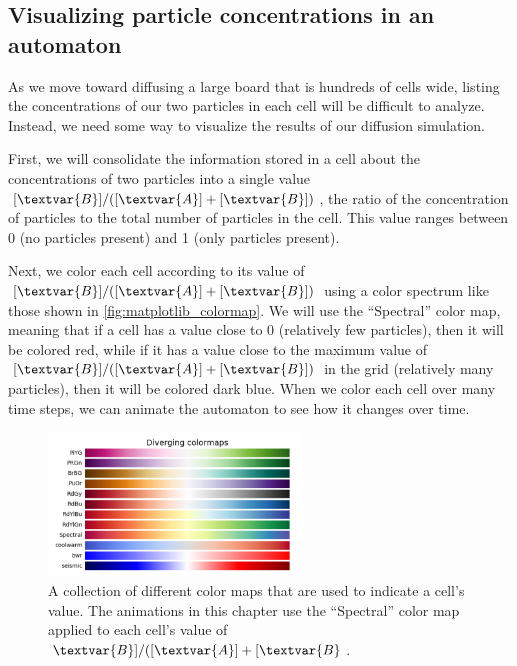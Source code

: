 \begin{qbox}[%
Update the cells in \autoref{fig:two_particle_concentration_diffusion} after another generation of diffusion, using the diffusion rates $d_A = 0.2$ and $d_B = 0.1$.
]\end{qbox}

\FloatBarrier
{}
\subsection{Visualizing particle concentrations in an automaton}

As we move toward diffusing a large board that is hundreds of cells wide, listing the concentrations of our two particles in each cell will be difficult to analyze. Instead, we need some way to visualize the results of our diffusion simulation.

First, we will consolidate the information stored in a cell about the concentrations of two particles into a single value $[\textvar{B}]/([\textvar{A}] + [\textvar{B}])$, the ratio of the concentration of  particles to the total number of particles in the cell. This value ranges between 0 (no  particles present) and 1 (only  particles present).\\

\begin{qbox}\end{qbox}

Next, we color each cell according to its value of $[\textvar{B}]/([\textvar{A}] + [\textvar{B}])$ using a color spectrum like those shown in \autoref{fig:matplotlib_colormap}. We will use the ``Spectral'' color map, meaning that if a cell has a value close to 0 (relatively few  particles), then it will be colored red, while if it has a value close to the maximum value of $[\textvar{B}]/([\textvar{A}] + [\textvar{B}])$ in the grid (relatively many  particles), then it will be colored dark blue. When we color each cell over many time steps, we can animate the automaton to see how it changes over time.\\

\begin{figure}[h]
\centering
\mySfFamily
\includegraphics[width = 0.6\textwidth]{../images/matplotlib_colormap.png}
\caption{A collection of different color maps that are used to indicate a cell's value. The animations in this chapter use the ``Spectral'' color map applied to each cell's value of $\textvar{B}]/([\textvar{A}] + [\textvar{B}$.}
\label{fig:matplotlib_colormap}
\end{figure}

